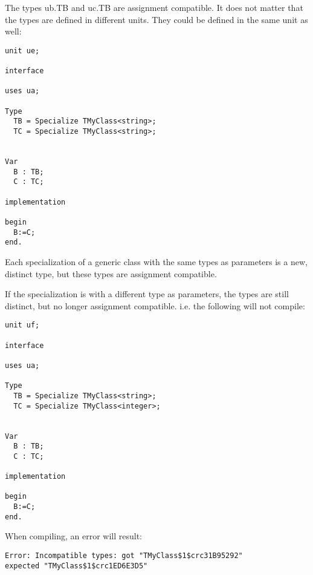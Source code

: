 The types ub.TB and  uc.TB are assignment compatible.
It does not matter that the types are defined in different units. They could
be defined in the same unit as well:
\begin{verbatim}
unit ue;

interface

uses ua;

Type
  TB = Specialize TMyClass<string>;
  TC = Specialize TMyClass<string>;


Var
  B : TB;
  C : TC;
  
implementation

begin
  B:=C;
end.
\end{verbatim}
Each specialization of a generic class with the same types as parameters is a new,
distinct type, but these types are assignment compatible.

If the specialization is with a different type as parameters, the types are
still distinct, but no longer assignment compatible. i.e. the following will
not compile:
\begin{verbatim}
unit uf;

interface

uses ua;

Type
  TB = Specialize TMyClass<string>;
  TC = Specialize TMyClass<integer>;


Var
  B : TB;
  C : TC;
  
implementation

begin
  B:=C;
end.   
\end{verbatim}
When compiling, an error will result:
\begin{verbatim}
Error: Incompatible types: got "TMyClass$1$crc31B95292" 
expected "TMyClass$1$crc1ED6E3D5"
\end{verbatim}

